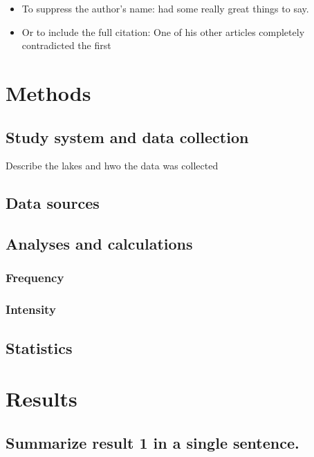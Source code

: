 \documentclass[11pt,]{article}
\providecommand{\tightlist}{%
\setlength{\itemsep}{0pt}\setlength{\parskip}{0pt}}
\begin{document}
\begin{itemize}
\tightlist
\item
  To suppress the author's name: \citet{smith2017a} had some really
  great things to say.
\item
  Or to include the full citation: One of his other articles completely
  contradicted the first \citep{smith2017b}
\end{itemize}

\section{Methods}\label{methods}

\subsection{Study system and data
collection}\label{study-system-and-data-collection}

Describe the lakes and hwo the data was collected

\subsection{Data sources}\label{data-sources}

\subsection{Analyses and calculations}\label{analyses-and-calculations}

\subsubsection{Frequency}\label{frequency}

\subsubsection{Intensity}\label{intensity}

\subsection{Statistics}\label{statistics}

\section{Results}\label{results}

\subsection{Summarize result 1 in a single
sentence.}\label{summarize-result-1-in-a-single-sentence.}
\end{document}
